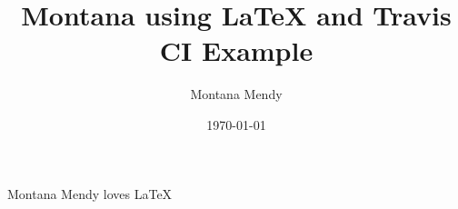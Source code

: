 \documentclass{article}
\title{Montana using LaTeX and Travis CI Example}
\author{Montana Mendy}
\date{\today}
\begin{document}
\maketitle

Montana Mendy loves LaTeX 
\end{document}
